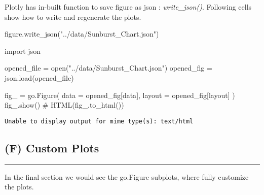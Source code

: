 \documentclass[
  letterpaper,
  DIV=11,
  numbers=noendperiod]{scrartcl}
\newenvironment{Shaded}{\begin{snugshade}}{\end{snugshade}}
\newcommand{\BuiltInTok}[1]{\textcolor[rgb]{0.00,0.23,0.31}{#1}}
\newcommand{\CommentTok}[1]{\textcolor[rgb]{0.37,0.37,0.37}{#1}}
\newcommand{\ImportTok}[1]{\textcolor[rgb]{0.00,0.46,0.62}{#1}}
\newcommand{\NormalTok}[1]{\textcolor[rgb]{0.00,0.23,0.31}{#1}}
\newcommand{\OperatorTok}[1]{\textcolor[rgb]{0.37,0.37,0.37}{#1}}
\newcommand{\StringTok}[1]{\textcolor[rgb]{0.13,0.47,0.30}{#1}}
\begin{document}
Plotly has in-built function to save figure as json :
\emph{write\_json()}. Following cells show how to write and regenerate
the plots.

\begin{Shaded}
\begin{Highlighting}[]
\NormalTok{figure.write\_json(}\StringTok{"../data/Sunburst\_Chart.json"}\NormalTok{)}
\end{Highlighting}
\end{Shaded}

\begin{Shaded}
\begin{Highlighting}[]
\ImportTok{import}\NormalTok{ json}

\NormalTok{opened\_file }\OperatorTok{=} \BuiltInTok{open}\NormalTok{(}\StringTok{"../data/Sunburst\_Chart.json"}\NormalTok{)}
\NormalTok{opened\_fig }\OperatorTok{=}\NormalTok{ json.load(opened\_file)}

\NormalTok{fig\_ }\OperatorTok{=}\NormalTok{ go.Figure(}
\NormalTok{    data }\OperatorTok{=}\NormalTok{ opened\_fig[}\StringTok{\textquotesingle{}data\textquotesingle{}}\NormalTok{],}
\NormalTok{    layout }\OperatorTok{=}\NormalTok{ opened\_fig[}\StringTok{\textquotesingle{}layout\textquotesingle{}}\NormalTok{]}
\NormalTok{    )}
\NormalTok{fig\_.show()}
\CommentTok{\# HTML(fig\_.to\_html()) }
\end{Highlighting}
\end{Shaded}

\begin{verbatim}
Unable to display output for mime type(s): text/html
\end{verbatim}

\hypertarget{f-custom-plots}{%
\subsection{(F) Custom Plots}\label{f-custom-plots}}

\begin{center}\rule{0.5\linewidth}{0.5pt}\end{center}

In the final section we would see the go.Figure subplots, where fully
customize the plots.
\end{document}
